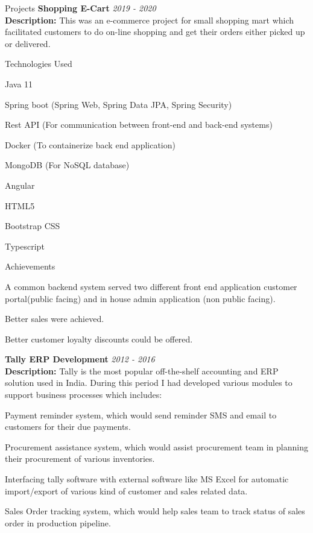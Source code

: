 \documentclass{resume}
\begin{document}
\begin{rSection}{Projects}
{\bf Shopping E-Cart} \hfill {\em  2019 - 2020} 
\\{\bf Description:} This was an e-commerce project for small shopping mart which facilitated customers to do on-line shopping and get their orders either picked up or delivered.

\begin{rSubsection}{Technologies Used}{}{}{}
\item Java 11
\item Spring boot (Spring Web, Spring Data JPA, Spring Security)
\item Rest API (For communication between front-end and back-end systems)
\item Docker (To containerize back end application)
\item MongoDB (For NoSQL database)

\item Angular
\item HTML5
\item Bootstrap CSS
\item Typescript
\end{rSubsection}

\begin{rSubsection}{Achievements}{}{}{}
\item A common backend system served two different front end application customer portal(public facing) and in house admin application (non public facing).
\item Better sales were achieved.
\item Better customer loyalty discounts could be offered. 
\end{rSubsection}


{\bf Tally ERP Development} \hfill {\em  2012 - 2016} 
\\{\bf Description:} Tally is the most popular off-the-shelf accounting and ERP solution used in India. During this period I had developed various modules to support business processes which includes:
\begin{rSubsection}{}{}{}{}
\item Payment reminder system, which would send reminder SMS and email to customers for their due payments.
\item Procurement assistance system, which would assist procurement team in planning their procurement of various inventories.
\item Interfacing tally software with external software like MS Excel for automatic import/export of various kind of customer and sales related data.
\item Sales Order tracking system, which would help sales team to track status of sales order in production pipeline.
\end{rSubsection}



\end{rSection}
\end{document}
